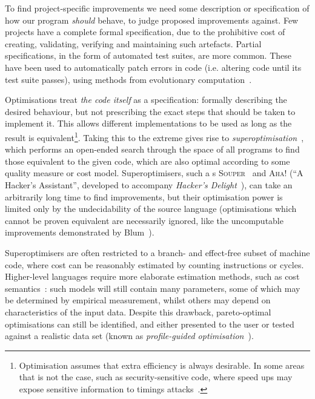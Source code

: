 To find project-specific improvements we need some description or specification
of how our program \emph{should} behave, to judge proposed improvements against.
Few projects have a complete formal specification, due to the prohibitive cost
of creating, validating, verifying and maintaining such artefacts. Partial
specifications, in the form of automated test suites, are more common. These
have been used to automatically patch errors in code (i.e. altering code until
its test suite passes), using methods from evolutionary
computation~\cite{Forrest.Nguyen.Weimer.ea:2009,weimer2009automatically,Schulte.Forrest.Weimer:2010}.

Optimisations treat \emph{the code itself} as a specification: formally
describing the desired behaviour, but not prescribing the exact steps that
should be taken to implement it. This allows different implementations to be
used as long as the result is equivalent\footnote{Optimisation assumes that
  extra efficiency is always desirable. In some areas that is not the case, such
  as security-sensitive code, where speed ups may expose sensitive information
  to timings attacks~\cite{kocher1996timing}.}. Taking this to the extreme gives
rise to \emph{superoptimisation}~\cite{massalin1987superoptimizer}, which
performs an open-ended search through the space of all programs to find those
equivalent to the given code, which are also optimal according to some quality
measure or cost model. Superoptimisers, such a
s \textsc{Souper}~\cite{sasnauskas2017souper} and \textsc{Aha!} (``A Hacker's
Assistant'', developed to accompany \emph{Hacker's
  Delight}~\cite{warren2013hacker}), can take an arbitrarily long time to find
improvements, but their optimisation power is limited only by the undecidability
of the source language (optimisations which cannot be proven equivalent are
necessarily ignored, like the uncomputable improvements demonstrated by
Blum~\cite{blum1967machine}).

Superoptimisers are often restricted to a branch- and effect-free subset of
machine code, where cost can be reasonably estimated by counting instructions or
cycles. Higher-level languages require more elaborate estimation methods, such
as cost semantics~\cite{danner2015denotational}: such models will still contain
many parameters, some of which may be determined by empirical measurement,
whilst others may depend on characteristics of the input data. Despite this
drawback, pareto-optimal optimisations can still be identified, and either
presented to the user or tested against a realistic data set (known as
\emph{profile-guided optimisation}~\cite{TODO}).

